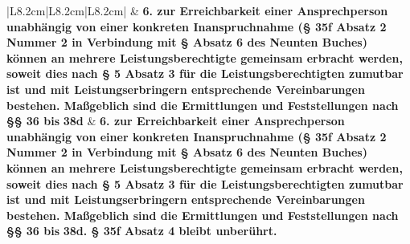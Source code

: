 \documentclass[10pt,a4paper,landscape]{article}
\begin{document}
\begin{longtable}{|L{8.2cm}|L{8.2cm}|L{8.2cm}|}
 & \textbf{6.   \newline zur Erreichbarkeit einer  \newline Ansprechperson unabhängig von einer  \newline konkreten Inanspruchnahme (\S{} 35f  \newline Absatz 2 Nummer 2 in Verbindung mit \S{}   Absatz 6 des Neunten Buches)  \newline können an mehrere  \newline Leistungsberechtigte gemeinsam  \newline erbracht werden, soweit dies nach \S{} 5  \newline Absatz 3 für die Leistungsberechtigten  \newline zumutbar ist und mit  \newline Leistungserbringern entsprechende  \newline Vereinbarungen bestehen. Maßgeblich  \newline sind die Ermittlungen und  \newline Feststellungen nach \S{}\S{} 36 bis }\textbf{\textcolor{diffred}{38d}} & \textbf{6.   \newline zur Erreichbarkeit einer  \newline Ansprechperson unabhängig von einer  \newline konkreten Inanspruchnahme (\S{} 35f  \newline Absatz 2 Nummer 2 in Verbindung mit \S{}   Absatz 6 des Neunten Buches)   \newline können an mehrere  \newline Leistungsberechtigte gemeinsam  \newline erbracht werden, soweit dies nach \S{} 5  \newline Absatz 3 für die Leistungsberechtigten  \newline zumutbar ist und mit  \newline Leistungserbringern entsprechende  \newline Vereinbarungen bestehen. Maßgeblich  \newline sind die Ermittlungen und  \newline Feststellungen nach \S{}\S{} 36 bis }\textbf{\textcolor{diffgreen}{38d. \S{} 35f  \newline Absatz 4 bleibt unberührt.}} \\
\hhline{|---|}

\end{longtable}
\end{document}
